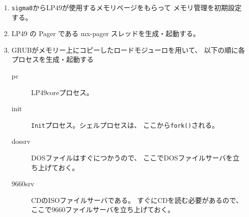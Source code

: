 \begin{enumerate}
\item  {\tt sigma0}からLP49が使用するメモリページをもらって
  メモリ管理を初期設定する。

\item  LP49 の Pager である mx-pager スレッドを生成・起動する。

\item  GRUBがメモリー上にコピーしたロードモジューロを用いて、
       以下の順に各プロセスを生成・起動する

       \begin{description}
       \item[pc]  LP49coreプロセス。
       \item[init] {\tt Init}プロセス。シェルプロセスは、
            ここから{\tt fork()}される。
       \item[dossrv] DOSファイルはすぐにつかうので、
           ここでDOSファイルサーバを立ち上げておく。
       \item[9660srv]  CDのISOファイルサーバである。
           すぐにCDを読む必要があるので、
           ここで9660ファイルサーバを立ち上げておく。
       \end{description}
\end{enumerate}



\begin{comment}
\begin{enumerate}
\item {\tt GRUB} は、ブートCDイメージの{\tt boot/grub/menu.lst} の内容に従って
  L4の {\tt kickstart,  L4-kernal, l4-sigam0}, 
   及び LP49の {\tt hvm, pc, qsh, dossrv} のロードモジュールを
  メモリーにコピーした上で、L4の{\tt kickstart} を起動する。

\item {\tt kickstart}は、{\tt L4-kernel}本体と、{\tt sigma0}を立ち上げ、
  LP49の{\tt hvm}を起動する。

\item  {\tt hvm}は、メモリ上のロードモジュールを用いて
  {\tt pc, qsh, dossrv} を個別プロセスとして生成し、起動する。

\item  {\tt hvm} は、{\tt pager}（ソースは {\tt src/9/hvm/mx-pager.c}) を生成する。

\item  {\tt pager}スレッドは {\tt hvm}の要であり、
  他プロセスからの要求メッセージを待ち、ページ割付、スレッド生成などを行う。
\end{enumerate}
\end{comment}



